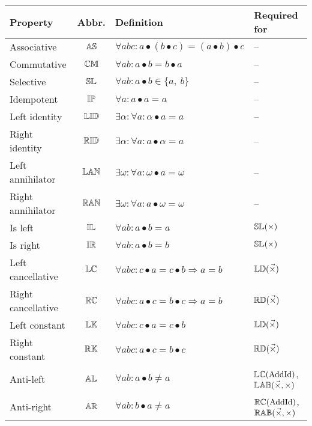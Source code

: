 \begin{tabular}{lclp{2cm}}
\toprule
Property & Abbr. & Definition & Required for\\
\midrule
Associative & ${\mathbb{AS}}$	& $\forall a b c : a \bullet (b \bullet c) = (a \bullet b) \bullet c$ & -- \\
Commutative & ${\mathbb{CM}}$	& $\forall a b : a\bullet b =  b\bullet a$ & --\\
Selective	& ${\mathbb{SL}}$	& $\forall a b : a\bullet b  \in  \{a,\ b\}$ & --\\
Idempotent	& ${\mathbb{IP}}$	& $\forall a : a\bullet a  =  a$ & --\\
Left identity 	& ${\mathbb{LID}}$	& $\exists \alpha : \forall a : \alpha \bullet a = a$ & --\\
Right identity 	& ${\mathbb{RID}}$	& $\exists \alpha : \forall a : a \bullet \alpha = a$ & --\\
Left annihilator & ${\mathbb{LAN}}$	& $\exists \omega : \forall a : \omega \bullet a = \omega$ & --\\
Right annihilator & ${\mathbb{RAN}}$	& $\exists \omega : \forall a : a \bullet \omega = \omega$ & --\\
\midrule
Is left 			& ${\mathbb{IL}}$ 	&  $\forall a b : a \bullet b = a$ & ${\mathbb{SL}}(\times)$ \\
Is right 			& ${\mathbb{IR}}$ 	&  $\forall a b : a \bullet b = b$ & ${\mathbb{SL}}(\times)$ \\
Left cancellative 	& ${\mathbb{LC}}$ 	&  $\forall a b c :  c \bullet a = c \bullet b \Rightarrow a = b $ & ${\mathbb{LD}}(\vec{\times})$ \\
Right cancellative 	& ${\mathbb{RC}}$ 	&  $\forall a b c :  a \bullet c = b \bullet c \Rightarrow a = b $ & ${\mathbb{RD}}(\vec{\times})$ \\
Left constant 		& ${\mathbb{LK}}$ 	&  $\forall a b c : c \bullet a = c \bullet b$ & ${\mathbb{LD}}(\vec{\times})$ \\
Right constant 		& ${\mathbb{RK}}$ 	&  $\forall a b c : a \bullet c =  b \bullet c$ & ${\mathbb{RD}}(\vec{\times})$ \\
Anti-left			& ${\mathbb{AL}}$ 	&  $\forall a b : a \bullet b \neq a $ & $ {\mathbb{LC}}(\mathrm{AddId})$, ${\mathbb{LAB}}(\vec{\times}, \times) $ \\
Anti-right 			& ${\mathbb{AR}}$ 	&  $\forall a b : b \bullet a \neq a$ & ${\mathbb{RC}}(\mathrm{AddId})$, ${\mathbb{RAB}}(\vec{\times}, \times)$ \\
\bottomrule
\end{tabular}
